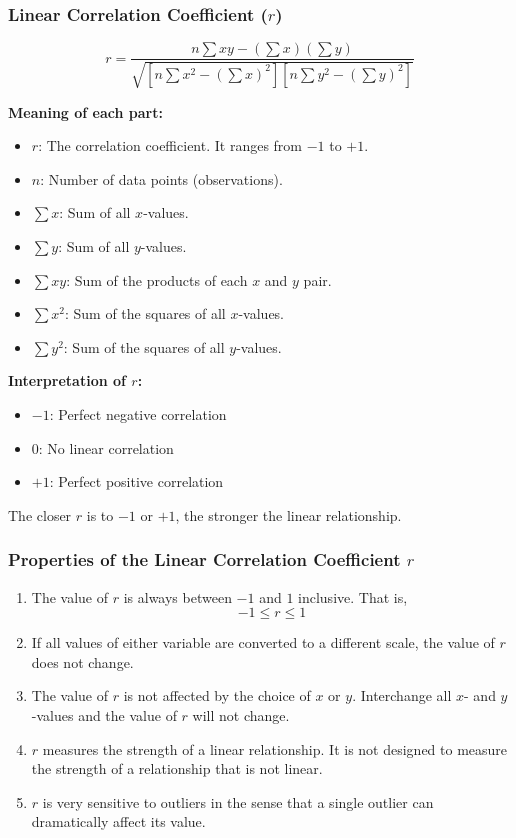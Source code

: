 \documentclass[12pt]{article}
\begin{document}
	\subsubsection*{Linear Correlation Coefficient ($r$)}
	
	\[
	r=
	\frac{n\sum xy-(\sum x)(\sum y)}
	{\sqrt{\left[n\sum x^2-(\sum x)^2\right]\left[n\sum y^2-(\sum y)^2\right]}}
	\]
	
	\textbf{Meaning of each part:}
	\begin{itemize}
		\item $r$: The correlation coefficient. It ranges from $-1$ to $+1$.
		\item $n$: Number of data points (observations).
		\item $\sum x$: Sum of all $x$-values.
		\item $\sum y$: Sum of all $y$-values.
		\item $\sum xy$: Sum of the products of each $x$ and $y$ pair.
		\item $\sum x^2$: Sum of the squares of all $x$-values.
		\item $\sum y^2$: Sum of the squares of all $y$-values.
	\end{itemize}
	
	\textbf{Interpretation of $r$:}
	\begin{itemize}
		\item $-1$: Perfect negative correlation
		\item $0$: No linear correlation
		\item $+1$: Perfect positive correlation
	\end{itemize}
	
	The closer $r$ is to $-1$ or $+1$, the stronger the linear relationship.
	
	\subsubsection*{Properties of the Linear Correlation Coefficient $r$}
	
	\begin{enumerate}
		\item The value of $r$ is always between $-1$ and $1$ inclusive. That is,
		\[
		-1 \leq r \leq 1
		\]
		
		\item If all values of either variable are converted to a different scale, the value of $r$ does not change.
		
		\item The value of $r$ is not affected by the choice of $x$ or $y$. Interchange all $x$- and $y$-values and the value of $r$ will not change.
		
		\item $r$ measures the strength of a linear relationship. It is not designed to measure the strength of a relationship that is not linear.
		
		\item $r$ is very sensitive to outliers in the sense that a single outlier can dramatically affect its value.
	\end{enumerate}
	
\end{document}

